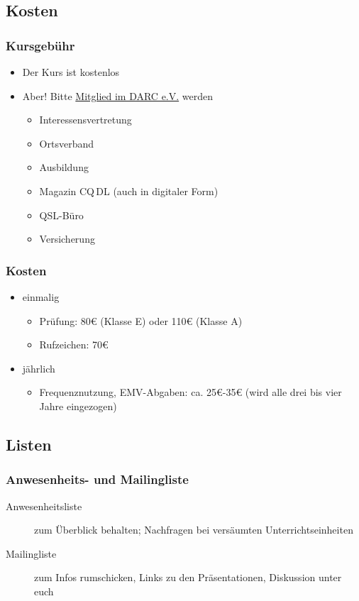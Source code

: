\subsection{Kosten}

\begin{frame}
  \frametitle{Kursgebühr}

  \begin{itemize}
    \item Der Kurs ist kostenlos
    \item Aber! Bitte \href{https://www.darc.de/der-club/mitgliedschaft/}{\ExternalLink Mitglied im DARC e.V.} werden
      \begin{itemize}
        \item Interessensvertretung
        \item Ortsverband
        \item Ausbildung
        \item Magazin CQ\,DL (auch in digitaler Form)
        \item QSL-Büro
        \item Versicherung
      \end{itemize}
  \end{itemize}
\end{frame}

\begin{frame}
  \frametitle{Kosten}

  \begin{itemize}
    \item einmalig
      \begin{itemize}
        \item Prüfung: 80€ (Klasse E) oder 110€ (Klasse A)
        \item Rufzeichen: 70€
      \end{itemize}
    \item jährlich
      \begin{itemize}
        \item Frequenznutzung, EMV-Abgaben: ca. 25€-35€ (wird alle drei bis vier Jahre eingezogen)
      \end{itemize}
  \end{itemize}
\end{frame}

\subsection{Listen}

\begin{frame}
  \frametitle{Anwesenheits- und Mailingliste}

  \begin{description}
    \item[Anwesenheitsliste] zum Überblick behalten; Nachfragen bei versäumten Unterrichtseinheiten
    \item[Mailingliste] zum Infos rumschicken, Links zu den Präsentationen, Diskussion unter euch
  \end{description}
\end{frame}


